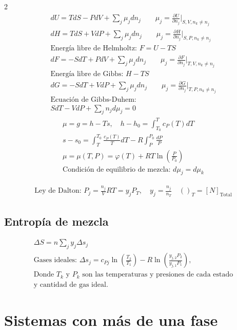 \documentclass[9pt]{article}
\begin{document}
\begin{multicols}{2}
\begin{gather*}
  dU = TdS - PdV + \sum_j \mu_j dn_j \qquad \mu_j = \frac{\partial U}{\partial n_j}\biggr\rvert_{S,V,n_k\neq n_j}\\
  dH = TdS + VdP + \sum_j \mu_j dn_j \qquad \mu_j = \frac{\partial H}{\partial n_j}\biggr\rvert_{S,P,n_k\neq n_j}\\
  \text{Energía libre de Helmholtz: } F= U-TS\\
  dF = -SdT + PdV + \sum_j \mu_j dn_j \qquad \mu_j = \frac{\partial F}{\partial n_j}\biggr\rvert_{T,V,n_k\neq n_j}\\
  \text{Energía libre de Gibbs: } H-TS\\
  dG = -SdT + VdP + \sum_j \mu_j dn_j \qquad \mu_j = \frac{\partial G}{\partial n_j}\biggr\rvert_{T,P,n_k\neq n_j}\\
  \text{Ecuación de Gibbs-Duhem: }\\
  SdT- VdP + \sum_j n_j d\mu_j=0
\end{gather*}
\begin{gather*}
  \mu = g = h-Ts, \quad h-h_0 = \int_{T_0}^{T}c_P(T)dT\\
  s-s_0 = \int_{T}^{T_0}\frac{c_P(T)}{T}dT - R\int_{P}^{P_0}\frac{dP}{P}\\
  \mu = \mu (T,P) = \varphi(T) + RT\ln(\frac{P}{P_0})\\
  \text{Condición de equilibrio de mezcla: } d\mu_j=d\mu_k
\end{gather*}

\begin{gather*}
  \text{Ley de Dalton: } P_j = \frac{n_j}{V}RT = y_j P_T, \quad y_j = \frac{n_j}{n_T} \quad ()_T = [N]_\text{Total}
\end{gather*}

\subsection{Entropía de mezcla}
\begin{gather*}
  \Delta S = n \sum_j y_j \Delta s_j\\
  \text{Gases ideales: }\Delta s_j = c_{Pj}\ln(\frac{T_2}{T_1})-R\ln(\frac{y_{j,2}P_2}{y_{j,1}P_1}),\\
  \text{Donde $T_k$ y $P_k$ son las temperaturas y presiones de cada estado}\\
  \text{y cantidad de gas ideal.}
\end{gather*}

\section{Sistemas con más de una fase}


\end{multicols}
\end{document}
